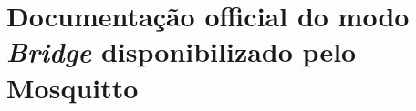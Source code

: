 \chapter[Documentação do Modo Bridge]{Documentação official do modo \textit{Bridge} disponibilizado pelo Mosquitto\textregistered~}

\label{ane:bridge}

\newpage
